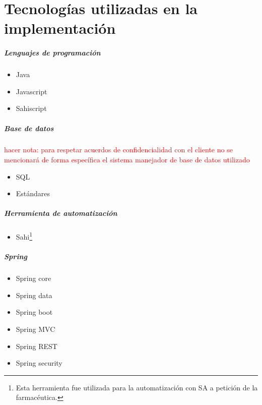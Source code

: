 \chapter{Tecnologías utilizadas en la implementación}

\paragraph{Lenguajes de programación}
	\begin{itemize}
		\item Java
		\item Javascript
		\item Sahiscript
	\end{itemize}
\paragraph{Base de datos}
	\textcolor{red}{hacer nota: para respetar acuerdos de confidencialidad con el cliente no se mencionará de forma específica el sistema manejador de base de datos utilizado}
	\begin{itemize}
		\item SQL
		\item Estándares
	\end{itemize}

\paragraph{Herramienta de automatización}
	\begin{itemize}
		\item Sahi\footnote{Esta herramienta fue utilizada para la automatización con SA a petición de la farmacéutica.}
	\end{itemize}
\paragraph{Spring}
	\begin{itemize}
		\item Spring core\cite{SpringInAction}
		\item Spring data\cite{SpringInAction}
		\item Spring boot\cite{SpringBootInAction}
		\item Spring MVC\cite{SpringInAction}
		\item Spring REST\cite{SpringInAction}
		\item Spring security\cite{ProSpringSecurity}
	\end{itemize}


